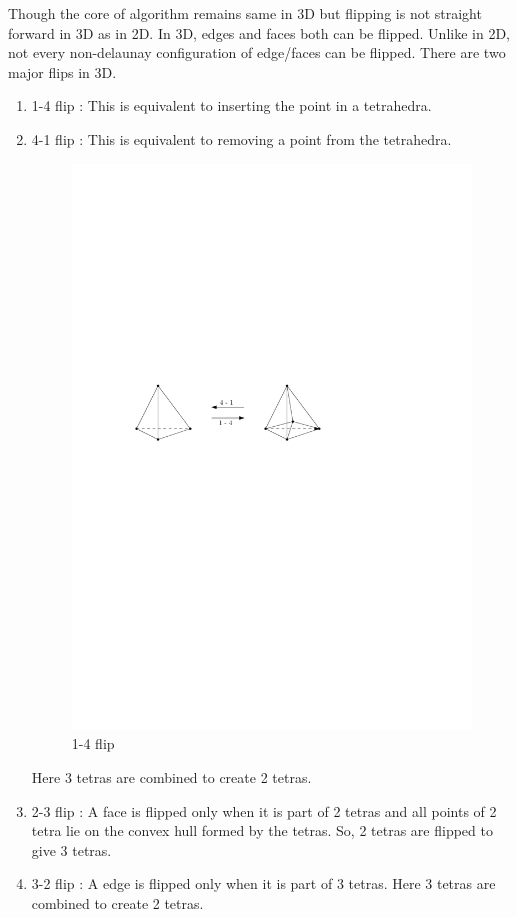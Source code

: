 Though the core of algorithm remains same in 3D but flipping is not straight forward in 3D as in 2D. In 3D, edges and faces both can be flipped. Unlike in 2D, not every non-delaunay configuration of edge/faces  can be flipped. There are two major flips in 3D. 
\begin{enumerate}
	\item 1-4 flip : This is equivalent to inserting the point in a tetrahedra.
	\item 4-1 flip : This is equivalent to removing a point from the tetrahedra.

\begin{figure}[ht]
    \centering
    \includegraphics{images/1-4.pdf}
    \caption{1-4 flip}
    \label{fig:1_4_flip}
\end{figure}

Here 3 tetras are combined to create 2 tetras.
	\item 2-3 flip : A face is flipped only when it is part of 2 tetras and all points of 2 tetra lie on the convex hull formed by the tetras. So, 2 tetras are flipped to give 3 tetras.
	\item 3-2 flip : A edge is flipped only when it is part of 3 tetras.
Here 3 tetras are combined to create 2 tetras.


\end{enumerate}
